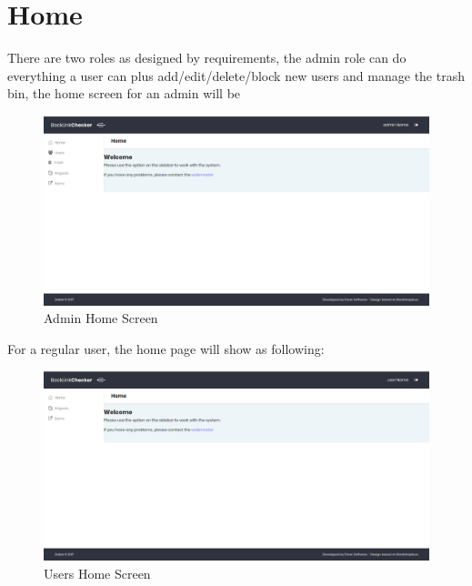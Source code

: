 \section{Home}
There are two roles as designed by requirements, the admin role can do everything a user can plus add/edit/delete/block new users and manage the trash bin, the home screen for an admin will be
\begin{figure}[H]
	\caption{Admin Home Screen}
	\label{img:admin}
	\includegraphics[width=\textwidth]{images/admin_screenshot}
\end{figure}

For a regular user, the home page will show as following:
\begin{figure}[H]
	\caption{Users Home Screen}
	\label{img:usrmng}
	\includegraphics[width=\textwidth]{images/users_home}
\end{figure}

